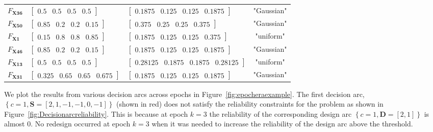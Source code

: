 \begin{table}[h!]
\begin{tabular}{l>{\centering\arraybackslash}p{4.2cm}>{\centering\arraybackslash}p{6cm}c}
	\hline
	$F_{\mathbf{X36}}$ & $\begin{bmatrix} 0.5 & 0.5 & 0.5 & 0.5 \end{bmatrix}$ & $\begin{bmatrix} 0.1875 & 0.125 & 0.125 & 0.1875 \end{bmatrix}$ & "Gaussian" \\
	$F_{\mathbf{X50}}$ & $\begin{bmatrix} 0.85 & 0.2 & 0.2 & 0.15 \end{bmatrix}$ & $\begin{bmatrix} 0.375 & 0.25 & 0.25 & 0.375 \end{bmatrix}$ & "Gaussian" \\
	$F_{\mathbf{X1}}$ & $\begin{bmatrix} 0.15 & 0.8 & 0.8 & 0.85 \end{bmatrix}$ & $\begin{bmatrix} 0.1875 & 0.125 & 0.125 & 0.375 \end{bmatrix}$ & "uniform" \\
	$F_{\mathbf{X46}}$ & $\begin{bmatrix} 0.85 & 0.2 & 0.2 & 0.15 \end{bmatrix}$ & $\begin{bmatrix} 0.1875 & 0.125 & 0.125 & 0.1875 \end{bmatrix}$ & "Gaussian" \\
	$F_{\mathbf{X13}}$ & $\begin{bmatrix} 0.5 & 0.5 & 0.5 & 0.5 \end{bmatrix}$ & $\begin{bmatrix} 0.28125 & 0.1875 & 0.1875 & 0.28125 \end{bmatrix}$ & "uniform" \\
	$F_{\mathbf{X31}}$ & $\begin{bmatrix} 0.325 & 0.65 & 0.65 & 0.675 \end{bmatrix}$ & $\begin{bmatrix} 0.1875 & 0.125 & 0.125 & 0.1875 \end{bmatrix}$ & "Gaussian" \\
	\hline\hline
	\end{tabular}
\end{table}

We plot the results from various decision arcs across epochs in Figure~\ref{fig:epocheraexample}. The first decision arc, $\left\{c=1,\mathbf{S}=\left[2,1,-1,-1,0,-1\right]\right\}$ (shown in red) does not satisfy the reliability constraints for the problem as shown in Figure~\ref{fig:Decisionarcreliability}. This is because at epoch $k=3$ the reliability of the corresponding design arc $\left\{c=1,\mathbf{D}=\left[2,1\right]\right\}$ is almost 0. No redesign occurred at epoch $k=3$ when it was needed to increase the reliability of the design arc above the threshold.

